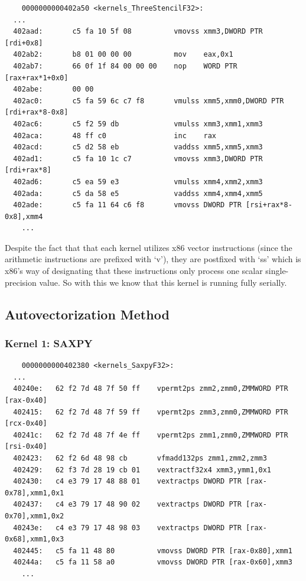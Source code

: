 \documentclass[11pt]{article}
\begin{document}
\begin{verbatim}
	0000000000402a50 <kernels_ThreeStencilF32>:
  ...
  402aad:       c5 fa 10 5f 08          vmovss xmm3,DWORD PTR [rdi+0x8]
  402ab2:       b8 01 00 00 00          mov    eax,0x1
  402ab7:       66 0f 1f 84 00 00 00    nop    WORD PTR [rax+rax*1+0x0]
  402abe:       00 00 
  402ac0:       c5 fa 59 6c c7 f8       vmulss xmm5,xmm0,DWORD PTR [rdi+rax*8-0x8]
  402ac6:       c5 f2 59 db             vmulss xmm3,xmm1,xmm3
  402aca:       48 ff c0                inc    rax
  402acd:       c5 d2 58 eb             vaddss xmm5,xmm5,xmm3
  402ad1:       c5 fa 10 1c c7          vmovss xmm3,DWORD PTR [rdi+rax*8]
  402ad6:       c5 ea 59 e3             vmulss xmm4,xmm2,xmm3
  402ada:       c5 da 58 e5             vaddss xmm4,xmm4,xmm5
  402ade:       c5 fa 11 64 c6 f8       vmovss DWORD PTR [rsi+rax*8-0x8],xmm4
	...
\end{verbatim}

Despite the fact that that each kernel utilizes x86 vector instructions (since the arithmetic instructions are prefixed
with `v'), they are postfixed with `ss' which is x86's way of designating that these instructions only process one
scalar single-precision value. So with this we know that this kernel is running fully serially.

\subsection{Autovectorization Method}

\subsubsection{Kernel 1: SAXPY}

\begin{verbatim}
	0000000000402380 <kernels_SaxpyF32>:
  ...
  40240e:	62 f2 7d 48 7f 50 ff 	vpermt2ps zmm2,zmm0,ZMMWORD PTR [rax-0x40]
  402415:	62 f2 7d 48 7f 59 ff 	vpermt2ps zmm3,zmm0,ZMMWORD PTR [rcx-0x40]
  40241c:	62 f2 7d 48 7f 4e ff 	vpermt2ps zmm1,zmm0,ZMMWORD PTR [rsi-0x40]
  402423:	62 f2 6d 48 98 cb    	vfmadd132ps zmm1,zmm2,zmm3
  402429:	62 f3 7d 28 19 cb 01 	vextractf32x4 xmm3,ymm1,0x1
  402430:	c4 e3 79 17 48 88 01 	vextractps DWORD PTR [rax-0x78],xmm1,0x1
  402437:	c4 e3 79 17 48 90 02 	vextractps DWORD PTR [rax-0x70],xmm1,0x2
  40243e:	c4 e3 79 17 48 98 03 	vextractps DWORD PTR [rax-0x68],xmm1,0x3
  402445:	c5 fa 11 48 80       	vmovss DWORD PTR [rax-0x80],xmm1
  40244a:	c5 fa 11 58 a0       	vmovss DWORD PTR [rax-0x60],xmm3
	...
\end{verbatim}
\end{document}
